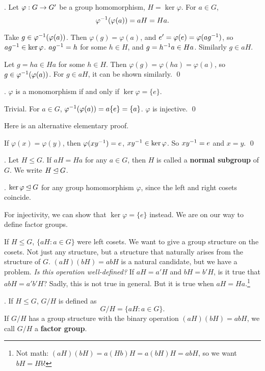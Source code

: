 \thm. Let \(\varphi : G \rightarrow G'\) be a group homomorphism, \(H = \ker \varphi\). For \(a \in G\),
\[
    \varphi^{-1}(\varphi(a)) = aH = Ha.
\]

\pf \note{\(\subset\)} Take \(g \in \varphi^{-1}(\varphi(a))\). Then \(\varphi(g) = \varphi(a)\), and \(e' = \varphi(e) = \varphi(ag^{-1})\), so \(ag^{-1} \in \ker\varphi\). \(ag^{-1} = h\) for some \(h \in H\), and \(g = h^{-1} a \in Ha\). Similarly \(g \in aH\).

\note{\(\supset\)} Let \(g = ha \in Ha\) for some \(h \in H\). Then \(\varphi(g) = \varphi(ha) = \varphi(a)\), so \(g \in \varphi^{-1}(\varphi(a))\). For \(g \in aH\), it can be shown similarly. \qed

\cor. \(\varphi\) is a monomorphism if and only if \(\ker\varphi = \{e\}\).

\pf \note{\mimp} Trivial. \note{\mimpd} For \(a \in G\), \(\varphi^{-1}(\varphi(a)) = a \{e\} = \{a\}\). \(\varphi\) is injective. \qed

Here is an alternative elementary proof.

\pf \note{\mimpd} If \(\varphi(x) = \varphi(y)\), then \(\varphi(xy^{-1}) = e\), \(xy^{-1} \in \ker\varphi\). So \(xy^{-1} = e\) and \(x = y\). \qed

.  Let \(H \leq G\). If \(aH = Ha\) for any \(a \in G\), then \(H\) is called a \textbf{normal subgroup} of \(G\). We write \(H \unlhd G\).

\cor. \(\ker\varphi \unlhd G\) for any group homomorphism \(\varphi\), since the left and right cosets coincide.

For injectivity, we can show that \(\ker \varphi = \{e\}\) instead. We are on our way to define factor groups.


If \(H \leq G\), \(\{aH : a \in G\}\) were left cosets. We want to give a group structure on the cosets. Not just any structure, but a structure that naturally arises from the structure of \(G\). \((aH)(bH) = abH\) is a natural candidate, but we have a problem. \textit{Is this operation well-defined?} If \(aH = a'H\) and \(bH = b'H\), is it true that \(abH = a'b'H\)? Sadly, this is not true in general. But it is true when \(aH = Ha\).\footnote{Not math: \((aH)(bH) = a(Hb)H = a(bH)H = abH\), so we want \(bH = Hb\)!}

.  If \(H \leq G\), \(G/H\) is defined as
\[
    G/H = \{aH : a \in G\}.
\]
If \(G/H\) has a group structure with the binary operation \((aH)(bH) = abH\), we call \(G/H\) a \textbf{factor group}.

